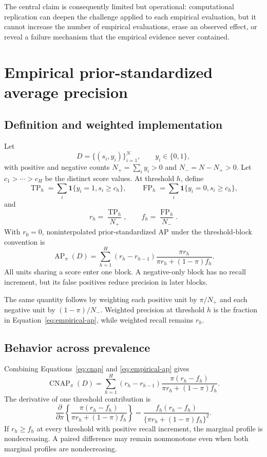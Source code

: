 \documentclass[11pt]{article}
\newcommand{\AP}{\operatorname{AP}}
\newcommand{\CNAP}{\operatorname{CNAP}}
\theoremstyle{remark}
\begin{document}
The central claim is consequently limited but operational: computational
replication can deepen the challenge applied to each empirical evaluation, but
it cannot increase the number of empirical evaluations, erase an observed
effect, or reveal a failure mechanism that the empirical evidence never
contained.


\appendix

\section{Empirical prior-standardized average precision}
\label{app:ap}

\subsection{Definition and weighted implementation}

Let
\[
D=\{(s_i,y_i)\}_{i=1}^N,
\qquad y_i\in\{0,1\},
\]
with positive and negative counts $N_+=\sum_i y_i>0$ and
$N_-=N-N_+>0$. Let $c_1>\cdots>c_H$ be the distinct score values. At
threshold $h$, define
\[
\operatorname{TP}_h
=\sum_i\mathbf 1\{y_i=1,s_i\geq c_h\},
\qquad
\operatorname{FP}_h
=\sum_i\mathbf 1\{y_i=0,s_i\geq c_h\},
\]
and
\[
r_h=\frac{\operatorname{TP}_h}{N_+},
\qquad
f_h=\frac{\operatorname{FP}_h}{N_-}.
\]
With $r_0=0$, noninterpolated prior-standardized AP under the threshold-block
convention is
\begin{equation}
\AP_\pi(D)
=
\sum_{h=1}^H
(r_h-r_{h-1})
\frac{\pi r_h}{\pi r_h+(1-\pi)f_h}.
\label{eq:empirical-ap}
\end{equation}
All units sharing a score enter one block. A negative-only block has no recall
increment, but its false positives reduce precision in later blocks.

The same quantity follows by weighting each positive unit by $\pi/N_+$ and
each negative unit by $(1-\pi)/N_-$. Weighted precision at threshold $h$ is
the fraction in Equation~\eqref{eq:empirical-ap}, while weighted recall remains
$r_h$.

\subsection{Behavior across prevalence}

Combining Equations~\eqref{eq:cnap} and \eqref{eq:empirical-ap} gives
\begin{equation}
\CNAP_\pi(D)
=
\sum_{h=1}^H
(r_h-r_{h-1})
\frac{\pi(r_h-f_h)}
{\pi r_h+(1-\pi)f_h}.
\label{eq:cnap-profile}
\end{equation}
The derivative of one threshold contribution is
\begin{equation}
\frac{\partial}{\partial\pi}
\left\{
\frac{\pi(r_h-f_h)}
{\pi r_h+(1-\pi)f_h}
\right\}
=
\frac{f_h(r_h-f_h)}
{\{\pi r_h+(1-\pi)f_h\}^2}.
\label{eq:cnap-derivative}
\end{equation}
If $r_h\geq f_h$ at every threshold with positive recall increment, the
marginal profile is nondecreasing. A paired difference may remain nonmonotone
even when both marginal profiles are nondecreasing.
\end{document}
